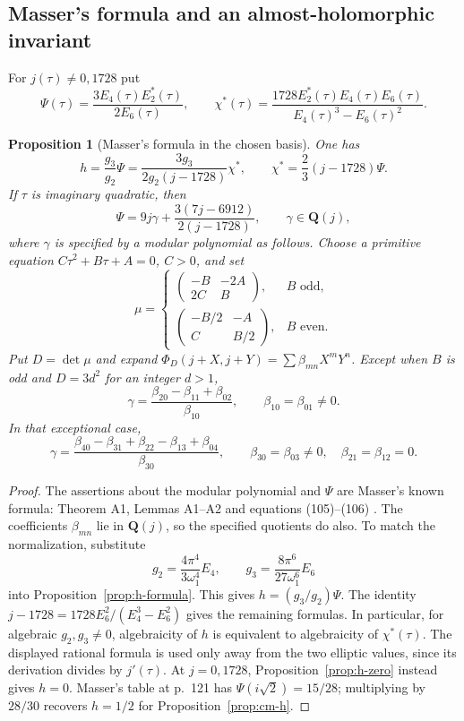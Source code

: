 \documentclass[11pt]{article}
\newtheorem{proposition}[theorem]{Proposition}
\theoremstyle{definition}\newtheorem{definition}[theorem]{Definition}
\theoremstyle{remark}\newtheorem{remark}[theorem]{Remark}
\newcommand{\Q}{\mathbf Q}\newcommand{\Z}{\mathbf Z}
\begin{document}
\subsection{Masser's formula and an almost-holomorphic invariant}
For $j(\tau)\ne0,1728$ put
\[
 \Psi(\tau)=\frac{3E_4(\tau)E_2^*(\tau)}{2E_6(\tau)},\qquad
 \chi^*(\tau)=\frac{1728E_2^*(\tau)E_4(\tau)E_6(\tau)}
 {E_4(\tau)^3-E_6(\tau)^2}.
\]
\begin{proposition}[Masser's formula in the chosen basis]\label{prop:masser-normalization}
One has
\[
 h=\frac{g_3}{g_2}\Psi
   =\frac{3g_3}{2g_2(j-1728)}\chi^*,\qquad
 \chi^*=\frac23(j-1728)\Psi.
\]
If $\tau$ is imaginary quadratic, then
\[
 \Psi=9j\gamma+\frac{3(7j-6912)}{2(j-1728)},\qquad \gamma\in\Q(j),
\]
where $\gamma$ is specified by a modular polynomial as follows. Choose a primitive equation $C\tau^2+B\tau+A=0$, $C>0$, and set
\[
 \mu=\begin{cases}
 \left(\begin{smallmatrix}-B&-2A\\2C&B\end{smallmatrix}\right),& B\text{ odd},\\
 \left(\begin{smallmatrix}-B/2&-A\\C&B/2\end{smallmatrix}\right),& B\text{ even}.
 \end{cases}
\]
Put $D=\det\mu$ and expand
$\Phi_D(j+X,j+Y)=\sum\beta_{mn}X^mY^n$.
Except when $B$ is odd and $D=3d^2$ for an integer $d>1$,
\[
 \gamma=\frac{\beta_{20}-\beta_{11}+\beta_{02}}{\beta_{10}},
 \qquad \beta_{10}=\beta_{01}\ne0.
\]
In that exceptional case,
\[
 \gamma=\frac{\beta_{40}-\beta_{31}+\beta_{22}-\beta_{13}+\beta_{04}}
                  {\beta_{30}},
 \qquad \beta_{30}=\beta_{03}\ne0,\quad\beta_{21}=\beta_{12}=0.
\]
\end{proposition}
\begin{proof}
The assertions about the modular polynomial and $\Psi$ are Masser's known formula: Theorem A1, Lemmas A1--A2 and equations (105)--(106) \cite[pp.~114, 116--119]{Masser}. The coefficients $\beta_{mn}$ lie in $\Q(j)$, so the specified quotients do also. To match the normalization, substitute
\[
 g_2=\frac{4\pi^4}{3\omega_1^4}E_4,\qquad
 g_3=\frac{8\pi^6}{27\omega_1^6}E_6
\]
into Proposition~\ref{prop:h-formula}. This gives $h=(g_3/g_2)\Psi$. The identity
$j-1728=1728E_6^2/(E_4^3-E_6^2)$ gives the remaining formulas. In particular, for algebraic $g_2,g_3\ne0$, algebraicity of $h$ is equivalent to algebraicity of $\chi^*(\tau)$. The displayed rational formula is used only away from the two elliptic values, since its derivation divides by $j'(\tau)$. At $j=0,1728$, Proposition~\ref{prop:h-zero} instead gives $h=0$. Masser's table at p.~121 has $\Psi(i\sqrt2)=15/28$; multiplying by $28/30$ recovers $h=1/2$ for Proposition~\ref{prop:cm-h}.
\end{proof}
\end{document}

